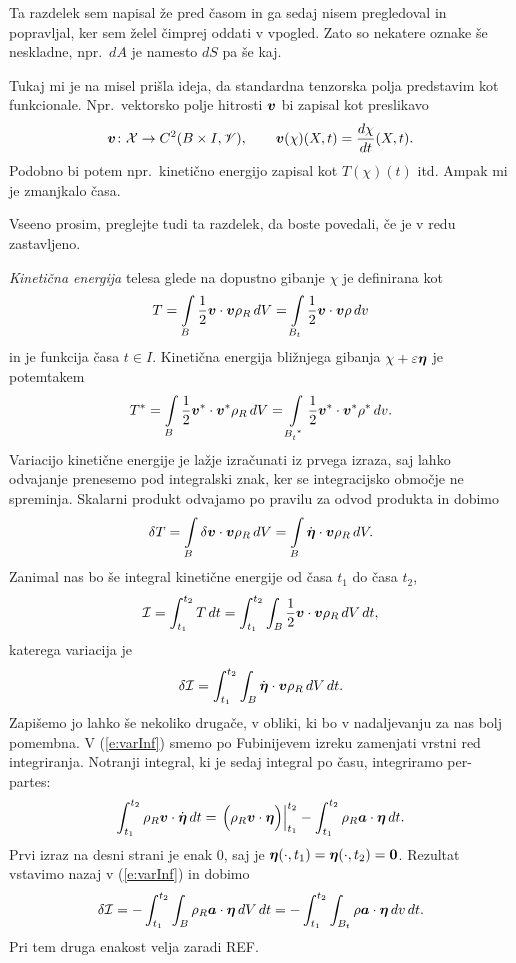 \begin{rdece}Ta razdelek sem napisal že pred časom in ga sedaj nisem pregledoval
in popravljal, ker sem želel čimprej oddati v vpogled. Zato so nekatere oznake še
neskladne, npr.~$dA$ je namesto $dS$ pa še kaj.

Tukaj mi je na misel prišla ideja,
da standardna tenzorska polja predstavim kot funkcionale. Npr.~vektorsko polje hitrosti
$\boldsymbol v$ bi zapisal kot preslikavo
\[ \boldsymbol v\colon\mathcal{X}\to C^2(B\times I,\mathscr V),\qquad \boldsymbol v(\chi)(X,t)=\frac{d\chi}{dt}(X,t). \]
Podobno bi potem npr.~kinetično energijo zapisal kot $T(\chi)(t)$ itd. Ampak mi je zmanjkalo časa.

Vseeno prosim, preglejte tudi ta razdelek, da boste povedali, če je v redu zastavljeno.
\end{rdece}

\emph{Kinetična energija} telesa glede na dopustno gibanje $\chi$ je definirana kot
\begin{equation*}
	T = \int\limits_{B}\frac{1}{2}\boldsymbol v\cdot\boldsymbol v\rho_R\, dV =
	\int\limits_{B_t}\frac{1}{2}\boldsymbol v\cdot\boldsymbol v\rho\, dv
\end{equation*}
in je funkcija časa $t\in I$. Kinetična energija bližnjega gibanja $\chi+\varepsilon\boldsymbol \eta$
je potemtakem
\begin{equation*}
	T^* = \int\limits_{B}\frac{1}{2}\vek{v}^*\cdot\vek{v}^*\rho_R\, dV =
	\int\limits_{\bottop{B}{t}{*}}\frac{1}{2}\vek{v}^*\cdot\vek{v}^*\rho^*\, dv.
\end{equation*}
Variacijo kinetične energije je lažje izračunati iz prvega izraza, saj lahko odvajanje prenesemo pod
integralski znak, ker se integracijsko območje ne spreminja. Skalarni produkt odvajamo
po pravilu za odvod produkta in dobimo
\[
	\delta T =
	\int\limits_{B}\delta\boldsymbol v\cdot\boldsymbol v\rho_R\, dV=
	\int\limits_{B}\dot{\boldsymbol \eta}\cdot\boldsymbol v\rho_R\, dV.
\]
Zanimal nas bo še integral kinetične energije od časa $t_1$ do časa $t_2$,
\[ \mathcal{I}=\int_{t_1}^{t_2} T\,dt=\int_{t_1}^{t_2} \int_{B}\frac{1}{2}\boldsymbol v\cdot\boldsymbol v\rho_R\, dV \,dt, \]
katerega variacija je
\begin{equation}\label{e:varInf}
	\delta \mathcal{I}=\int_{t_1}^{t_2}\int_{B}\dot{\boldsymbol \eta}\cdot\boldsymbol v\rho_R\, dV\, dt.
\end{equation}
Zapišemo jo lahko še nekoliko drugače, v obliki, ki bo v nadaljevanju za nas bolj pomembna.
V (\ref{e:varInf}) smemo po Fubinijevem izreku zamenjati vrstni red integriranja.
Notranji integral, ki je sedaj integral po času, integriramo per-partes:
\[
	\int_{t_1}^{t_2}\rho_R\boldsymbol v\cdot\dot{\boldsymbol \eta}\, dt =
	\left.\Big(\rho_R\boldsymbol v\cdot\boldsymbol \eta\Big)\right|_{t_1}^{t_2}-
	\int_{t_1}^{t_2}\rho_R\boldsymbol a\cdot\boldsymbol \eta\,dt.
\]
Prvi izraz na desni strani je enak 0, saj je $\boldsymbol \eta(\cdot,t_1)=\boldsymbol \eta(\cdot,t_2)=\boldsymbol 0$.
Rezultat vstavimo nazaj v (\ref{e:varInf}) in dobimo
\begin{equation}\label{e:varkin}
	\delta \mathcal{I} =
	-\int_{t_1}^{t_2}\int_{B}\rho_R\boldsymbol a\cdot\boldsymbol \eta\, dV\, dt=
	-\int_{t_1}^{t_2}\int_{B_t}\rho\boldsymbol a\cdot\boldsymbol \eta\, dv\, dt.
\end{equation}
Pri tem druga enakost velja zaradi REF.

